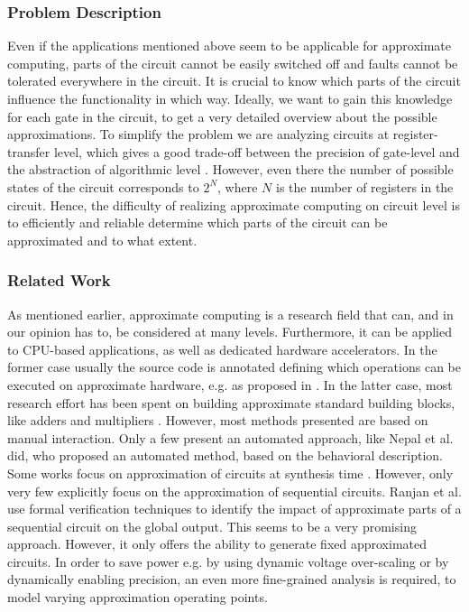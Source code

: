 \documentclass[10pt,twocolumn]{IEEEtran} %
\begin{document}
\subsubsection*{\bf{Problem Description}}
Even if the applications mentioned above seem to be applicable for approximate computing, parts of the circuit cannot be easily switched off and faults cannot be tolerated everywhere in the circuit. It is crucial to know which parts of the circuit influence the functionality in which way. Ideally, we want to gain this knowledge for each gate in the circuit, to get a very detailed overview about the possible approximations. To simplify the problem we are analyzing circuits at register-transfer level, which gives a good trade-off between the precision of gate-level and the abstraction of algorithmic level \cite{herkersdorf2014resilience}. However, even there the number of possible states of the circuit corresponds to $2^N$, where $N$ is the number of registers in the circuit. Hence, the difficulty of realizing approximate computing on circuit level is to efficiently and reliable determine which parts of the circuit can be approximated and to what extent.
\subsubsection*{\bf{Related Work}}
As mentioned earlier, approximate computing is a research field that can, and in our opinion has to, be considered at many levels. Furthermore, it can be applied to CPU-based applications, as well as dedicated hardware accelerators. In the former case usually the source code is annotated defining which operations can be executed on approximate hardware, e.g. as proposed in \cite{sampson_enerj:_2011}. In the latter case, most research effort has been spent on building approximate standard building blocks, like adders and multipliers \cite{huang_exploring_2011,gupta_impact:_2011,kahng_accuracy-configurable_2012}. However, most methods presented are based on manual interaction. Only a few present an automated approach, like Nepal et al. \cite{nepal_abacus:_2014} did, who proposed an automated method, based on the behavioral description. Some works focus on approximation of circuits at synthesis time \cite{miao_approximate_2013,shin_approximate_2010,choudhury_approximate_2008}. However, only very few explicitly focus on the approximation of sequential circuits. Ranjan et al. \cite{ranjan_aslan:_2014} use formal verification techniques to identify the impact of approximate parts of a sequential circuit on the global output. This seems to be a very promising approach. However, it only offers the ability to generate fixed approximated circuits. In order to save power e.g. by using dynamic voltage over-scaling or by dynamically enabling precision, an even more fine-grained analysis is required, to model varying approximation operating points.
\end{document}
